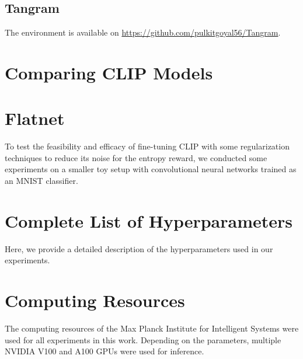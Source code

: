 \section{Tangram}
\label{sec:tangram-details}


The environment is available on \url{https://github.com/pulkitgoyal56/Tangram}.


\chapter{Comparing CLIP Models}
\label{sec:clip-comparison}



\chapter{Flatnet}
\label{sec:flatnet}
To test the feasibility and efficacy of fine-tuning CLIP with some regularization techniques to reduce its noise for the entropy reward, we conducted some experiments on a smaller toy setup with convolutional neural networks trained as an MNIST classifier.


\chapter{Complete List of Hyperparameters}
\label{sec:hyperparameters}
Here, we provide a detailed description of the hyperparameters used in our experiments.


\chapter{Computing Resources}
\label{sec:computing-resources}
The computing resources of the Max Planck Institute for Intelligent Systems were used for all experiments in this work.
Depending on the parameters, multiple NVIDIA V100 and A100 GPUs were used for inference.
